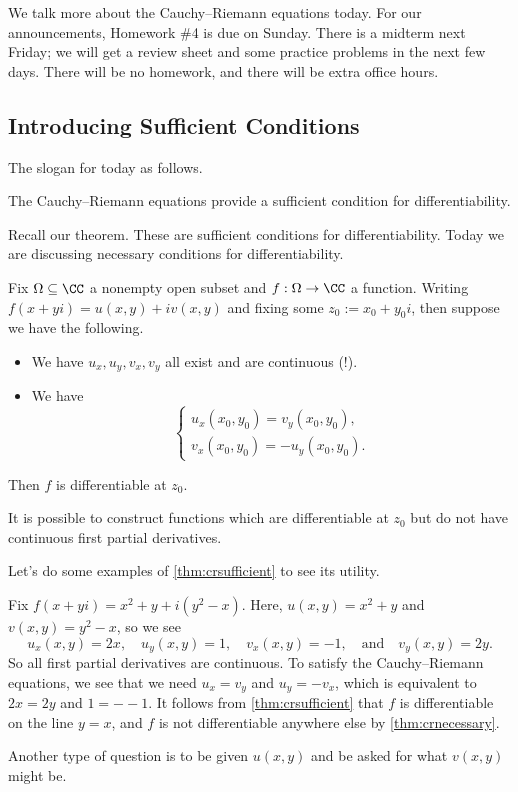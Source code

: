 
We talk more about the Cauchy--Riemann equations today. For our announcements, Homework \#4 is due on Sunday. There is a midterm next Friday; we will get a review sheet and some practice problems in the next few days. There will be no homework, and there will be extra office hours.

\subsection{Introducing Sufficient Conditions}

The slogan for today as follows.
\begin{idea}
	The Cauchy--Riemann equations provide a sufficient condition for differentiability.
\end{idea}
Recall our theorem.
\cauchyriemannnecessary*
\noindent These are sufficient conditions for differentiability. Today we are discussing necessary conditions for differentiability.
\begin{theorem} \label{thm:crsufficient}
	Fix $\Omega\subseteq\CC$ a nonempty open subset and $f:\Omega\to\CC$ a function. Writing $f(x+yi)=u(x,y)+iv(x,y)$ and fixing some $z_0:=x_0+y_0i$, then suppose we have the following.
	\begin{itemize}
		\item We have $u_x,u_y,v_x,v_y$ all exist and are continuous (!).
		\item We have
		\[\begin{cases}
			u_x(x_0,y_0)=v_y(x_0,y_0), \\
			v_x(x_0,y_0)=-u_y(x_0,y_0).
		\end{cases}\]
	\end{itemize}
	Then $f$ is differentiable at $z_0$.
\end{theorem}
\begin{remark}
	It is possible to construct functions which are differentiable at $z_0$ but do not have continuous first partial derivatives.
\end{remark}
Let's do some examples of \autoref{thm:crsufficient} to see its utility.
\begin{example}
	Fix $f(x+yi)=x^2+y+i\left(y^2-x\right)$. Here, $u(x,y)=x^2+y$ and $v(x,y)=y^2-x$, so we see
	\[u_x(x,y)=2x,\quad u_y(x,y)=1,\quad v_x(x,y)=-1,\quad\text{and}\quad v_y(x,y)=2y.\]
	So all first partial derivatives are continuous. To satisfy the Cauchy--Riemann equations, we see that we need $u_x=v_y$ and $u_y=-v_x$, which is equivalent to $2x=2y$ and $1=--1$. It follows from \autoref{thm:crsufficient} that $f$ is differentiable on the line $y=x$, and $f$ is not differentiable anywhere else by \autoref{thm:crnecessary}.
\end{example}
\begin{remark}
	Another type of question is to be given $u(x,y)$ and be asked for what $v(x,y)$ might be.
\end{remark}

